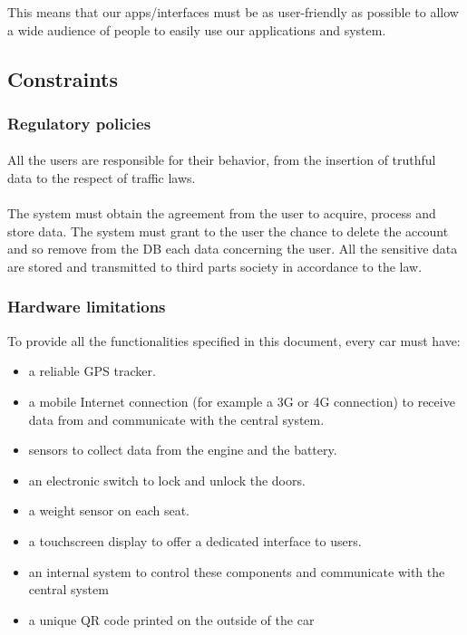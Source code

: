 \documentclass[english]{article}
\begin{document}
This means that our apps/interfaces must be as user-friendly as possible to allow a wide audience of people to easily use our applications and system.

\newpage
\subsection{Constraints}\label{constraints}

\subsubsection{Regulatory policies}

\paragraph{}
All the users are responsible for their behavior, from the insertion of truthful data to the respect of traffic laws.

\paragraph{}
The system must obtain the agreement from the user to acquire, process and store data.\newline
The system must grant to the user the chance to delete the account and so remove from the DB each data concerning the user.\newline
All the sensitive data are stored and transmitted to third parts society in accordance to the law.\newline

\subsubsection{Hardware limitations}

To provide all the functionalities specified in this document, every car must have:
\begin{itemize}
	\item{a reliable GPS tracker.}
	\item{a mobile Internet connection (for example a 3G or 4G connection) to receive data from and communicate with the central system.}
	\item{sensors to collect data from the engine and the battery.}
	\item{an electronic switch to lock and unlock the doors.}
	\item{a weight sensor on each seat.}
	\item{a touchscreen display to offer a dedicated interface to users.}
	\item{an internal system to control these components and communicate with the central system}
	\item{a unique QR code printed on the outside of the car}
\end{itemize}
\end{document}
